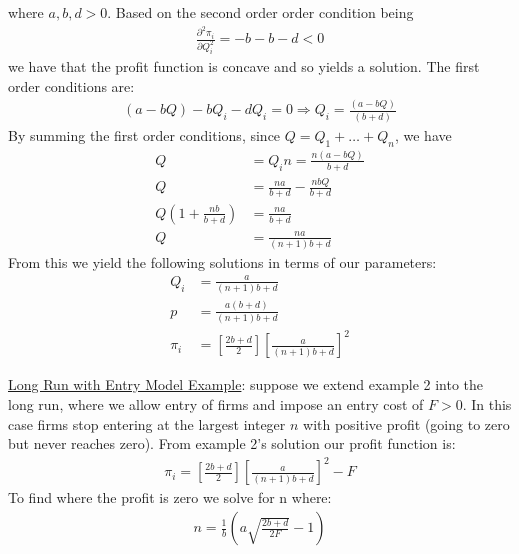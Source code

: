 \documentclass{article}
\begin{document}
  where $a,b,d > 0$. Based on the second order order condition being
  \begin{gather*}
    \frac{\partial^{2} \pi_{i}}{\partial Q_{i}^{2}} = -b -b - d < 0
  \end{gather*}
  we have that the profit function is concave and so yields a solution. The first order conditions are:
  \begin{gather*}
    (a-bQ) - bQ_{i} - dQ_{i} = 0 \Rightarrow Q_{i} = \frac{(a - bQ)}{(b + d)}
  \end{gather*}
  By summing the first order conditions, since $Q = Q_{1} + \dots + Q_{n}$, we have
  \begin{align*}
    Q &= Q_{i}n = \frac{n(a-bQ)}{b+d} \\
    Q &= \frac{na}{b+d} - \frac{nbQ}{b+d} \\
    Q(1+\frac{nb}{b+d}) &= \frac{na}{b+d} \\
    Q &= \frac{na}{(n+1)b + d}
  \end{align*}
  From this we yield the following solutions in terms of our parameters:
  \begin{align*}
    Q_{i} &= \frac{a}{(n+1)b+d} \\
    p &= \frac{a(b+d)}{(n+1)b+d} \\
    \pi_{i} &= [\frac{2b + d}{2}][\frac{a}{(n+1)b+d}]^{2}
  \end{align*}
  \par
  \underline{Long Run with Entry Model Example}: suppose we extend example 2 into the long run, where we allow entry of firms and impose an entry cost of $F > 0$. In this case firms stop entering at the largest integer $n$ with positive profit (going to zero but never reaches zero). From example 2's solution our profit function is:
  \begin{gather*}
    \pi_{i} = [\frac{2b + d}{2}][\frac{a}{(n+1)b+d}]^{2} - F
  \end{gather*}
  To find where the profit is zero we solve for n where:
  \begin{gather*}
    n = \frac{1}{b}(a \sqrt{\frac{2b + d}{2F}} - 1)
  \end{gather*}
\end{document}

